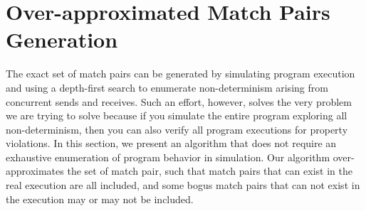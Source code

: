 

\section{ Over-approximated Match Pairs Generation}


The exact set of match pairs can be generated by simulating program execution and using a depth-first search to enumerate non-determinism arising from concurrent sends and receives. Such an effort, however, solves the very problem we are trying to solve because if you simulate the entire program exploring all non-determinism, then you can also verify all program executions for property violations. In this section, we present an algorithm that does not require an exhaustive enumeration of program behavior in simulation. Our algorithm over-approximates the set of match pair, such that match pairs that can exist in the real execution are all included, and some bogus match pairs that can not exist in the execution may or may not be included. %

